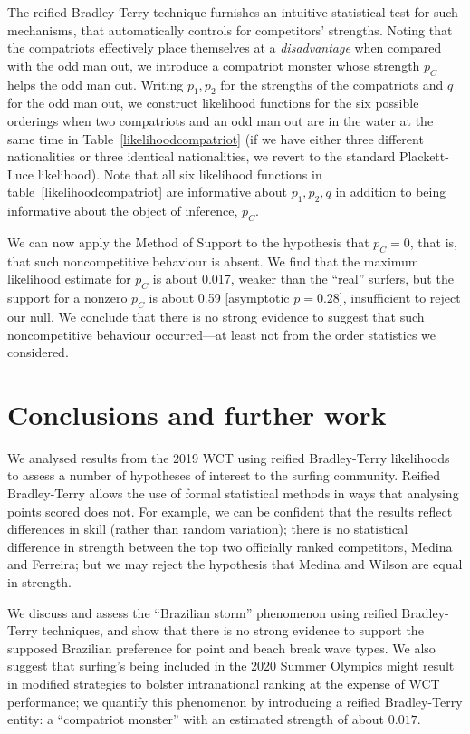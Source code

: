 \documentclass{article}
\begin{document}
The reified Bradley-Terry technique furnishes an intuitive statistical
test for such mechanisms, that automatically controls for competitors'
strengths.  Noting that the compatriots effectively place themselves
at a {\em disadvantage} when compared with the odd man out, we
introduce a compatriot monster whose strength $p_C$ helps the odd man
out.  Writing $p_1, p_2$ for the strengths of the compatriots and $q$
for the odd man out, we construct likelihood functions for the six
possible orderings when two compatriots and an odd man out are in the
water at the same time in Table~\ref{likelihoodcompatriot} (if we have
either three different nationalities or three identical nationalities,
we revert to the standard Plackett-Luce likelihood).  Note that all
six likelihood functions in table~\ref{likelihoodcompatriot} are
informative about $p_1,p_2,q$ in addition to being informative about
the object of inference, $p_C$.

We can now apply the Method of Support to the hypothesis that $p_C=0$,
that is, that such noncompetitive behaviour is absent.  We find that
the maximum likelihood estimate for $p_C$ is about 0.017, weaker than
the ``real'' surfers, but the support for a nonzero $p_C$ is about
0.59 [asymptotic $p=0.28$], insufficient to reject our null.  We
conclude that there is no strong evidence to suggest that such
noncompetitive behaviour occurred---at least not from the order
statistics we considered.

\section{Conclusions and further work}

We analysed results from the 2019 WCT using reified
Bradley-Terry likelihoods to assess a number of hypotheses of interest
to the surfing community.  Reified Bradley-Terry allows the use of
formal statistical methods in ways that analysing points scored does
not.  For example, we can be confident that the results reflect
differences in skill (rather than random variation); there is no
statistical difference in strength between the top two officially
ranked competitors, Medina and Ferreira; but we may reject the
hypothesis that Medina and Wilson are equal in strength.

We discuss and assess the ``Brazilian storm'' phenomenon using reified
Bradley-Terry techniques, and show that there is no strong evidence to
support the supposed Brazilian preference for point and beach break
wave types.  We also suggest that surfing's being included in the 2020
Summer Olympics might result in modified strategies to bolster
intranational ranking at the expense of WCT performance; we quantify
this phenomenon by introducing a reified
Bradley-Terry entity: a ``compatriot monster'' with an estimated
strength of about $0.017$.
\end{document}
